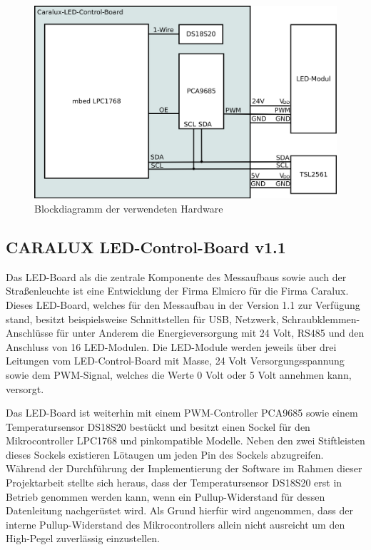 \documentclass[a4paper,12pt]{scrartcl}
\begin{document}
\begin{figure}[htb]
\begin{center}
\includegraphics[width=0.8\hsize]{./schematics/blockDiagramm.png}
\end{center}
\caption{\label{fig:blockDia}Blockdiagramm der verwendeten Hardware}
\end{figure}

\subsection{CARALUX LED-Control-Board v1.1}
Das LED-Board als die zentrale Komponente des Messaufbaus sowie auch der Straßenleuchte ist eine Entwicklung der Firma Elmicro für die Firma Caralux. Dieses LED-Board, welches für den Messaufbau in der Version 1.1 zur Verfügung stand, besitzt beispielsweise Schnittstellen für USB, Netzwerk, Schraubklemmen-Anschlüsse für unter Anderem die Energieversorgung mit 24 Volt, RS485 und den Anschluss von 16 LED-Modulen. Die LED-Module werden jeweils über drei Leitungen vom LED-Control-Board mit Masse, 24 Volt Versorgungsspannung sowie dem PWM-Signal, welches die Werte 0 Volt oder 5 Volt annehmen kann, versorgt.

Das LED-Board ist weiterhin mit einem PWM-Controller PCA9685 sowie einem Temperatursensor DS18S20 bestückt und besitzt einen Sockel für den Mikrocontroller LPC1768 und pinkompatible Modelle. Neben den zwei Stiftleisten dieses Sockels existieren Lötaugen um jeden Pin des Sockels abzugreifen. Während der Durchführung der Implementierung der Software im Rahmen dieser Projektarbeit stellte sich heraus, dass der Temperatursensor DS18S20 erst in Betrieb genommen werden kann, wenn ein Pullup-Widerstand für dessen Datenleitung nachgerüstet wird. Als Grund hierfür wird angenommen, dass der interne Pullup-Widerstand des Mikrocontrollers allein nicht ausreicht um den High-Pegel zuverlässig einzustellen.
\end{document}

